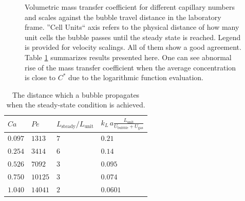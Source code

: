 \documentclass{article}
\newcommand{\vol}{k_L\,a}
\newcommand{\lunit}{L_{\mathrm{unit}}}
\newcommand{\ububble}{U_{\mathrm{bubble}}}
\newcommand{\ugas}{U_{\mathrm{gas}}}
\newcommand{\cstar}{C^{*}}
\newcommand{\volnondim}{\vol \frac{\lunit}{\ububble+\ugas}}
\begin{document}
\begin{figure}[htb!]
\caption{Volumetric mass transfer coefficient for different capillary numbers and scales against the
bubble travel distance in the laboratory frame. ''Cell Units`` axis refers to the physical
distance of how many unit cells the bubble passes until the steady state is reached. Legend is provided for velocity scalings. All of them show a good agreement. Table
\ref{table:steady:state:average}
summarizes results presented here. One can see abnormal rise of the mass transfer coefficient when the average concentration is close to $\cstar$ due to the logarithmic function evaluation. \label{fig:aver:conc:different:capillaries}}
\end{figure}
\begin{table}[htb!]
\begin{tabularx}{\textwidth}{|X|X|X|X|}
\hline
$Ca$    &$Pe$     &$L_{\mathrm{steady}}/\lunit$& $\volnondim$ \\
\hline
$0.097$ &$1313$  &$7$&$0.21$  \\ 
$0.254$ &$3414$  &$6$&$0.14$  \\ 
$0.526$ &$7092$  &$3$&$0.095$ \\
$0.750$ &$10125$ &$3$&$0.074$ \\
$1.040$ &$14041$ &$2$&$0.0601$\\
\hline
\end{tabularx}
\caption{The distance which a bubble propagates when the
steady-state condition is achieved. 
\label{table:steady:state:average}}
\end{table}
\end{document}
